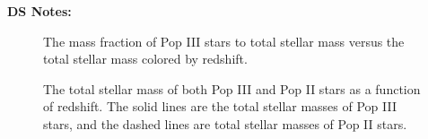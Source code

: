 \documentclass[11pt]{article}
\begin{document}
\textbf{DS Notes:}
\begin{figure}[h]
    \centering
    \qquad
    \caption{The mass fraction of Pop III stars to total stellar mass versus the total stellar mass colored by redshift.}%
    \label{fig:ratio}%
\end{figure}

\begin{figure}[h]
    \centering
    \qquad
    \caption{The total stellar mass of both Pop III and Pop II stars as a function of redshift. The solid lines are the total stellar masses of Pop III stars, and the dashed lines are total stellar masses of Pop II stars.}%
    \label{fig:ratio}%
\end{figure}
\end{document}
